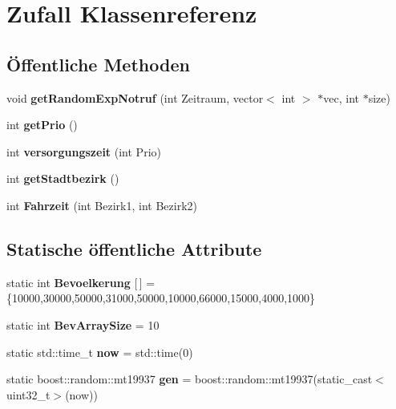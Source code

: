 \hypertarget{classZufall}{}\section{Zufall Klassenreferenz}
\label{classZufall}
\subsection*{Öffentliche Methoden}
\begin{DoxyCompactItemize}
\item 
void {\bfseries get\+Random\+Exp\+Notruf} (int Zeitraum, vector$<$ int $>$ $\ast$vec, int $\ast$size)\hypertarget{classZufall_a0b0478a0493ac197fd447f66da4e2dec}{}\label{classZufall_a0b0478a0493ac197fd447f66da4e2dec}

\item 
int {\bfseries get\+Prio} ()\hypertarget{classZufall_a8d7735aac45ceb9a5fcce55aea5f131c}{}\label{classZufall_a8d7735aac45ceb9a5fcce55aea5f131c}

\item 
int {\bfseries versorgungszeit} (int Prio)\hypertarget{classZufall_aed840e095948ea0da9f6e80abdee4b97}{}\label{classZufall_aed840e095948ea0da9f6e80abdee4b97}

\item 
int {\bfseries get\+Stadtbezirk} ()\hypertarget{classZufall_a9388b4d00d91f5df299dc82b7ef18fb7}{}\label{classZufall_a9388b4d00d91f5df299dc82b7ef18fb7}

\item 
int {\bfseries Fahrzeit} (int Bezirk1, int Bezirk2)\hypertarget{classZufall_ae211b1e30f43f8c1f6f98f320de5a09c}{}\label{classZufall_ae211b1e30f43f8c1f6f98f320de5a09c}

\end{DoxyCompactItemize}
\subsection*{Statische öffentliche Attribute}
\begin{DoxyCompactItemize}
\item 
static int {\bfseries Bevoelkerung} \mbox{[}$\,$\mbox{]} = \{10000,30000,50000,31000,50000,10000,66000,15000,4000,1000\}\hypertarget{classZufall_a705f377c0385aae8983bc1900125bb85}{}\label{classZufall_a705f377c0385aae8983bc1900125bb85}

\item 
static int {\bfseries Bev\+Array\+Size} = 10\hypertarget{classZufall_a2282fcc0ef906d8ab1564f18fc8d02c5}{}\label{classZufall_a2282fcc0ef906d8ab1564f18fc8d02c5}

\item 
static std\+::time\+\_\+t {\bfseries now} = std\+::time(0)\hypertarget{classZufall_a453fef30bfcf43df2ac0f6a32727cec4}{}\label{classZufall_a453fef30bfcf43df2ac0f6a32727cec4}

\item 
static boost\+::random\+::mt19937 {\bfseries gen} = boost\+::random\+::mt19937(static\+\_\+cast$<$uint32\+\_\+t$>$(now))\hypertarget{classZufall_a0513d6b615dea0d472e347b8dfe566c1}{}\label{classZufall_a0513d6b615dea0d472e347b8dfe566c1}

\end{DoxyCompactItemize}


